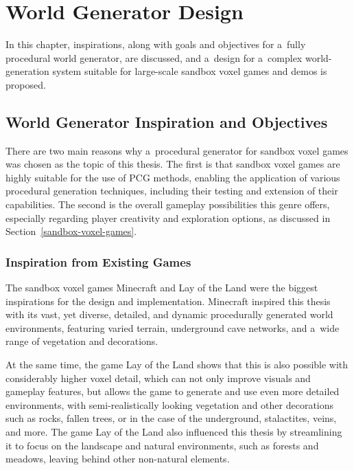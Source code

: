 \chapter{World Generator Design}\label{world-gen-design}

In this chapter, inspirations, along with goals and objectives for a~fully procedural world generator, are discussed, and a~design for a~complex world-generation system suitable for large-scale sandbox voxel games and demos is proposed.


\section{World Generator Inspiration and Objectives}

There are two main reasons why a~procedural generator for sandbox voxel games was chosen as the topic of this thesis. The first is that sandbox voxel games are highly suitable for the use of PCG methods, enabling the application of various procedural generation techniques, including their testing and extension of their capabilities. The second is the overall gameplay possibilities this genre offers, especially regarding player creativity and exploration options, as discussed in Section~\ref{sandbox-voxel-games}.

\subsection{Inspiration from Existing Games}

The sandbox voxel games Minecraft and Lay of the Land were the biggest inspirations for the design and implementation. Minecraft inspired this thesis with its vast, yet diverse, detailed, and dynamic procedurally generated world environments, featuring varied terrain, underground cave networks, and a~wide range of vegetation and decorations.

At the same time, the game Lay of the Land shows that this is also possible with considerably higher voxel detail, which can not only improve visuals and gameplay features, but allows the game to generate and use even more detailed environments, with semi-realistically looking vegetation and other decorations such as rocks, fallen trees, or in the case of the underground, stalactites, veins, and more. The game Lay of the Land also influenced this thesis by streamlining it to focus on the landscape and natural environments, such as forests and meadows, leaving behind other non-natural elements.


